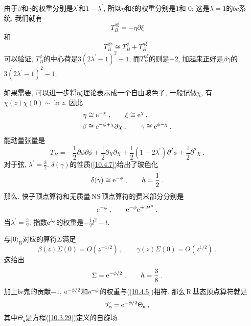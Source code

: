 \noindent 由于$ \beta $和$ \gamma $的权重分别是$ \lambda^{\prime} $和$ 1-\lambda^{\prime}$, 所以$ \eta $和$ \xi $的权重分别是$ 1 $和 $0$: 这是$ \lambda=1 $的$ bc $系统, 我们就有
\begin{equation}
    T_{B}^{\eta\xi} = -\eta \partial\xi \label{10.4.17}
\end{equation}
和
\begin{equation}
    T_{B}^{\beta\gamma} \cong T_{B}^{\phi} + T_{B}^{\eta\xi} \:. \label{10.4.18}
\end{equation}
可以验证, $T_{B}^{\phi} $的中心荷是$ 3(2\lambda^{\prime}-1)^{2}+1$, 而$ T_{B}^{\eta\xi} $的则是$ -2$, 加起来正好是$ \beta\gamma $的$ 3(2\lambda^{\prime}-1)^{2}-1$.

如果需要, 可以进一步将$ \eta\xi $理论表示成一个自由玻色子, 一般记做$ \chi$, 有$ \chi(z)\chi(0)\sim \ln z$. 因此
\begin{subequations}
\begin{align}
    \eta &\cong \mathrm{e}^{-\chi} \:, \qquad \xi \cong \mathrm{e}^{\chi} \:, \label{10.4.19a} \\
    \beta &\cong \mathrm{e}^{-\phi+\chi}\partial\chi\:, \qquad \gamma\cong \mathrm{e}^{\phi-\chi} \:. \label{10.4.19b}
\end{align} \label{10.4.19}
\end{subequations}
能动量张量是
\begin{equation}
    T_{B} = -\frac{1}{2}\partial\phi \partial\phi +\frac{1}{2}\partial\chi\partial\chi 
    +\frac{1}{2}(1-2\lambda^{\prime})\partial^{2}\phi + \frac{1}{2} \partial^{2}\chi \:. \label{10.4.20}
\end{equation}
对于弦, $\lambda^{\prime}=\frac{3}{2}$. $\delta(\gamma) $的性质(\ref{10.4.7})给出了玻色化
\begin{equation}
    \delta(\gamma)\cong \mathrm{e}^{-\phi}\:, \qquad h=\frac{1}{2} \:. \label{10.4.21}
\end{equation}
那么, 快子顶点算符和无质量\,NS\,顶点算符的费米部分分别是
\begin{equation}
    \mathrm{e}^{-\phi} \:, \qquad \mathrm{e}^{-\phi} \mathrm{e}^{\pm \mathrm{i} H^{a}}\:. \label{10.4.22}
\end{equation}
当$ \lambda^{\prime}=\frac{3}{2}$, 指数$ \mathrm{e}^{l\phi} $的权重是$ -\frac{1}{2}l^{2}-l$.

与$ \lvert 0\rangle _{\mathrm{R}} $对应的算符$ \Sigma $满足
\begin{equation}
    \beta(z)\Sigma(0) = O(z^{-1/2}) \:, \qquad \gamma(z)\Sigma(0) = O(z^{1/2}) \:. \label{10.4.23}
\end{equation}
这给出
\begin{equation}
    \Sigma = \mathrm{e}^{-\phi/2} \:, \qquad h = \frac{3}{8} \: .\label{10.4.24}
\end{equation}
加上$ bc $鬼的贡献$ -1$, $\mathrm{e}^{-\phi/2} $和$ \mathrm{e}^{-\phi} $的权重与(\ref{10.4.5})相符. 那么\,R\,基态顶点算符就是
\begin{equation}
    \mathscr{V}_{\mathbf{s}}=\mathrm{e}^{-\phi/2} \Theta_{\mathbf{s}} \:, \label{10.4.25}
\end{equation}
其中$ \Theta_{\mathbf{s}} $是方程(\ref{10.3.29})定义的自旋场.

